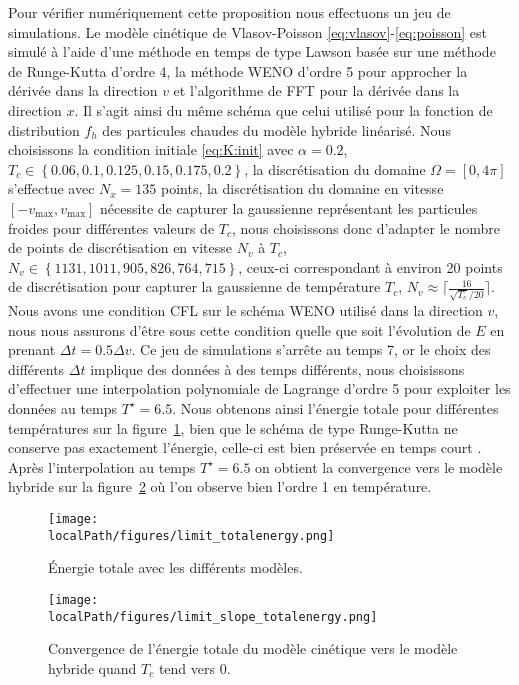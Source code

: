 Pour vérifier numériquement cette proposition nous effectuons un jeu de simulations. Le modèle cinétique de Vlasov-Poisson \eqref{eq:vlasov}-\eqref{eq:poisson} est simulé à l'aide d'une méthode en temps de type Lawson basée sur une méthode de Runge-Kutta d'ordre 4, la méthode WENO d'ordre 5 pour approcher la dérivée dans la direction $v$ et l'algorithme de FFT pour la dérivée dans la direction $x$. Il s'agit ainsi du même schéma que celui utilisé pour la fonction de distribution $f_h$ des particules chaudes du modèle hybride linéarisé. Nous choisissons la condition initiale \eqref{eq:K:init} avec $\alpha = 0.2$, $T_c \in \left\{ 0.06,0.1,0.125,0.15,0.175,0.2\right\}$, la discrétisation du domaine $\Omega = [0,4\pi]$ s'effectue avec $N_x = 135$ points, la discrétisation du domaine en vitesse $[-v_{\text{max}},v_{\text{max}}]$ nécessite de capturer la gaussienne représentant les particules froides pour différentes valeurs de $T_c$, nous choisissons donc d'adapter le nombre de points de discrétisation en vitesse $N_v$ à $T_c$, $N_v \in \left\{ 1131,1011,905,826,764,715 \right\}$, ceux-ci correspondant à environ 20 points de discrétisation pour capturer la gaussienne de temp\'erature $T_c$, $N_v \approx \lceil \frac{16}{{\sqrt{T_c}}/{20}} \rceil$. Nous avons une condition CFL sur le schéma WENO utilisé dans la direction $v$, nous nous assurons d'être sous cette condition quelle que soit l'évolution de $E$ en prenant $\Delta t = 0.5\Delta v$. Ce jeu de simulations s'arrête au temps 7, or le choix des différents $\Delta t$ implique des données à des temps différents, nous choisissons d'effectuer une interpolation polynomiale de Lagrange d'ordre 5 pour exploiter les données au temps $T^\star = 6.5$. Nous obtenons ainsi l'énergie totale pour différentes températures sur la figure~\ref{fig:limit:totalenergy}, bien que le schéma de type Runge-Kutta ne conserve pas exactement l'énergie, celle-ci est bien préservée en temps court . Apr\`es l'interpolation au temps $T^\star = 6.5$ on obtient la convergence vers le modèle hybride sur la figure~\ref{fig:limit:totalenergy:slope} où l'on observe bien l'ordre 1 en température.
\begin{figure}[h]
  \centering
  \texttt{[image: \\localPath/figures/limit\_totalenergy.png]}
  \caption{Énergie totale avec les différents modèles.}
  \label{fig:limit:totalenergy}
\end{figure}
\begin{figure}[h]
  \centering
  \texttt{[image: \\localPath/figures/limit\_slope\_totalenergy.png]}
  \caption{Convergence de l'énergie totale du modèle cinétique vers le modèle hybride quand $T_c$ tend vers $0$.}
  \label{fig:limit:totalenergy:slope}
\end{figure}

